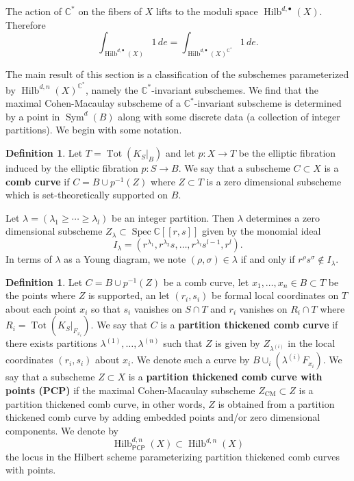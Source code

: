 \documentclass[12pt]{amsart}
\theoremstyle{definition}
\newtheorem{definition}[theorem]{Definition}
\newcommand{\CC} {\mathbb{C}}          %
\newcommand{\Sym}{\operatorname{Sym}}
\newcommand{\Hilb}{\operatorname{Hilb}}
\newcommand{\Tot}{\operatorname{Tot}}
\newcommand{\CM}{\operatorname{CM}}
\newcommand{\Spec}{\operatorname{Spec}}
\newcommand{\PCP}{\mathsf{PCP}}
\begin{document}
The action of $\CC^*$ on the fibers of $X$ lifts to the moduli space
$\Hilb^{d,\bullet}(X)$. Therefore
$$
\int_{\Hilb^{d,\bullet}(X)} 1 \, de = \int_{\Hilb^{d,\bullet}(X)^{\CC^*}} 1 \, de.
$$

The main result of this section is a classification of the subschemes
parameterized by $\Hilb^{d,n}(X)^{\CC^{*}}$, namely the
$\CC^{*}$-invariant subschemes.  We find that the maximal
Cohen-Macaulay subscheme of a $\CC^{*}$-invariant subscheme is
determined by a point in $\Sym^{d}(B)$ along with some discrete data
(a collection of integer partitions). We begin with some notation.




\begin{definition}\label{defn: comb curves} 
Let $T=\Tot(K_{S}|_{B})$ and let $p:X\to T$ be the elliptic fibration
induced by the elliptic fibration $p:S\to B$. We say that a subscheme $C\subset
X$ is a \textbf{comb curve} if $C=B\cup p^{-1}(Z) $ where $Z\subset T$
is a zero dimensional subscheme which is set-theoretically supported on
$B$.
\end{definition}

Let $\lambda =(\lambda_{1}\geq \dotsb \geq \lambda_{l}) $ be an
integer partition. Then $\lambda$ determines a zero dimensional subscheme
$Z_{\lambda}\subset \Spec \CC [[r,s]]$ given by the monomial ideal
\begin{equation}\label{eqn: monomial ideal I given by a partition lambda}
I_{\lambda}=(r^{\lambda_{1}},r^{\lambda_{2}}s,\dotsc
,r^{\lambda_{l}}s^{l-1},r^{l}).
\end{equation}
In terms of $\lambda$ as a Young diagram, we note $(\rho ,\sigma)\in
\lambda$ if and only if $r^{\rho}s^{\sigma}\notin I_{\lambda}.$

\begin{definition}\label{defn: partition thickened comb curve}
Let $C=B\cup p^{-1}(Z)$ be a comb curve, let $x_{1},\dotsc ,x_{n}\in
B\subset T$ be the points where $Z$ is supported, an let
$(r_{i},s_{i})$ be formal local coordinates on $T$ about each point
$x_{i}$ so that $s_{i}$ vanishes on $S\cap T$ and $r_{i}$
vanishes on $R_{i}\cap T$ where $R_{i}=\Tot (K_{S}|_{F_{x_{i}}})$. We
say that $C$ is a \textbf{partition thickened comb curve} if there
exists partitions $\lambda^{(1)},\dotsc ,\lambda^{(n)}$ such that $Z$
is given by $Z_{\lambda^{(i)}}$ in the local coordinates
$(r_{i},s_{i})$ about $x_{i}$. We denote such a curve by
$B\cup_{i}\left(\lambda^{(i)}F_{x_{i}} \right)$. We say that a
subscheme $Z\subset X$ is a \textbf{partition thickened comb curve
with points (PCP)} if the maximal Cohen-Macaulay subscheme
$Z_{\CM}\subset Z$ is a partition thickened comb curve, in other words,
$Z$ is obtained from a partition thickened comb curve by adding
embedded points and/or zero dimensional components. We denote by
\[
\Hilb^{d,n}_{\PCP}(X)\subset \Hilb^{d,n}(X)
\]
the locus in the Hilbert scheme parameterizing partition thickened
comb curves with points.
\end{definition}
\end{document}
